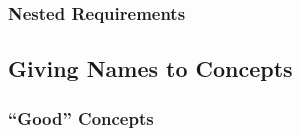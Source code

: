         \subsubsection*{Nested Requirements} \label{sec:nested_requirements}

        

\subsection{Giving Names to Concepts} \label{sec:giving_names_to_concepts}

    

    

    \subsubsection{``Good'' Concepts} \label{sec:good_concepts}
